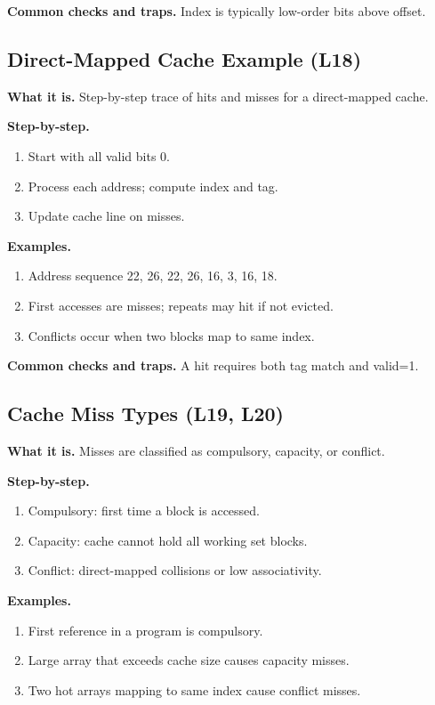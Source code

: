 \documentclass[11pt]{article}
\begin{document}
\textbf{Common checks and traps.} Index is typically low-order bits above offset.

\begin{figure}[h]
\centering
{}
\end{figure}

\subsection{Direct-Mapped Cache Example (L18)}
\textbf{What it is.} Step-by-step trace of hits and misses for a direct-mapped cache.

\textbf{Step-by-step.}
\begin{enumerate}[leftmargin=*]
  \item Start with all valid bits 0.
  \item Process each address; compute index and tag.
  \item Update cache line on misses.
\end{enumerate}

\textbf{Examples.}
\begin{enumerate}[leftmargin=*]
  \item Address sequence 22, 26, 22, 26, 16, 3, 16, 18.
  \item First accesses are misses; repeats may hit if not evicted.
  \item Conflicts occur when two blocks map to same index.
\end{enumerate}

\textbf{Common checks and traps.} A hit requires both tag match and valid=1.

\subsection{Cache Miss Types (L19, L20)}
\textbf{What it is.} Misses are classified as compulsory, capacity, or conflict.

\textbf{Step-by-step.}
\begin{enumerate}[leftmargin=*]
  \item Compulsory: first time a block is accessed.
  \item Capacity: cache cannot hold all working set blocks.
  \item Conflict: direct-mapped collisions or low associativity.
\end{enumerate}

\textbf{Examples.}
\begin{enumerate}[leftmargin=*]
  \item First reference in a program is compulsory.
  \item Large array that exceeds cache size causes capacity misses.
  \item Two hot arrays mapping to same index cause conflict misses.
\end{enumerate}
\end{document}
